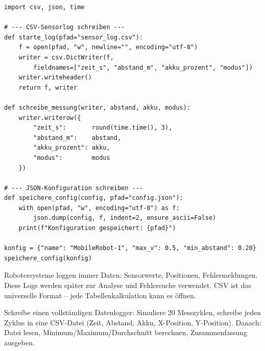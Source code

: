 \begin{lstlisting}
import csv, json, time

# --- CSV-Sensorlog schreiben ---
def starte_log(pfad="sensor_log.csv"):
    f = open(pfad, "w", newline="", encoding="utf-8")
    writer = csv.DictWriter(f,
        fieldnames=["zeit_s", "abstand_m", "akku_prozent", "modus"])
    writer.writeheader()
    return f, writer

def schreibe_messung(writer, abstand, akku, modus):
    writer.writerow({
        "zeit_s":       round(time.time(), 3),
        "abstand_m":    abstand,
        "akku_prozent": akku,
        "modus":        modus
    })

# --- JSON-Konfiguration schreiben ---
def speichere_config(config, pfad="config.json"):
    with open(pfad, "w", encoding="utf-8") as f:
        json.dump(config, f, indent=2, ensure_ascii=False)
    print(f"Konfiguration gespeichert: {pfad}")

konfig = {"name": "MobileRobot-1", "max_v": 0.5, "min_abstand": 0.20}
speichere_config(konfig)
\end{lstlisting}

\begin{praxis}
Robotersysteme loggen immer Daten: Sensorwerte, Positionen, Fehlermeldungen. Diese Logs werden später zur Analyse und Fehlersuche verwendet. CSV ist das universelle Format -- jede Tabellenkalkulation kann es öffnen.
\end{praxis}

\begin{uebung}[title=Projektaufgabe Modul 7: Datenlogger]
Schreibe einen vollständigen Datenlogger: Simuliere 20 Messzyklen, schreibe jeden Zyklus in eine CSV-Datei (Zeit, Abstand, Akku, X-Position, Y-Position). Danach: Datei lesen, Minimum/Maximum/Durchschnitt berechnen, Zusammenfassung ausgeben.
\end{uebung}
